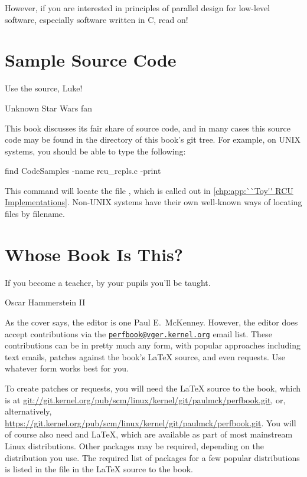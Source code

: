 However, if you are interested in principles of parallel design
for low-level software, especially software written in C, read on!

\section{Sample Source Code}
\label{sec:howto:Sample Source Code}
%
\epigraph{Use the source, Luke!}{Unknown Star Wars fan}

This book discusses its fair share of source code, and in many cases
this source code may be found in the  directory
of this book's git tree.
For example, on UNIX systems, you should be able to type the following:

\begin{VerbatimU}
find CodeSamples -name rcu_rcpls.c -print
\end{VerbatimU}

This command will locate the file , which is called out in
\cref{chp:app:``Toy'' RCU Implementations}\@.
Non-UNIX systems have their own well-known ways of locating files by filename.

\section{Whose Book Is This?}
\label{sec:howto:Whose Book Is This?}
%
\epigraph{If you become a teacher, by your pupils you'll be taught.}
	 {Oscar Hammerstein II}

As the cover says, the editor is one Paul E.~McKenney.
However, the editor does accept contributions via the
\href{mailto:perfbook@vger.kernel.org}
{\nolinkurl{perfbook@vger.kernel.org}} email list.
These contributions can be in pretty much any form, with popular
approaches including text emails,
patches against the book's \LaTeX{} source, and even  requests.
Use whatever form works best for you.

To create patches or  requests, you will need the
\LaTeX{} source to the book, which is at
\url{git://git.kernel.org/pub/scm/linux/kernel/git/paulmck/perfbook.git},
or, alternatively,
\url{https://git.kernel.org/pub/scm/linux/kernel/git/paulmck/perfbook.git}.
You will of course also need  and \LaTeX{}, which are
available as part of most mainstream Linux distributions.
Other packages may be required, depending on the distribution you use.
The required list of packages for a few popular distributions is listed
in the file  in the \LaTeX{} source to the book.

